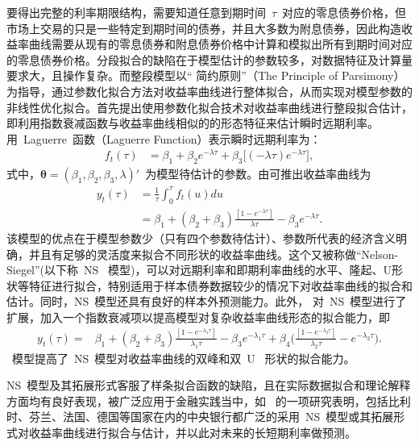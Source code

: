 要得出完整的利率期限结构，需要知道任意到期时间~$\tau$~对应的零息债券价格，但市场上交易的只是一些特定到期时间的债券，并且大多数为附息债券，因此构造收益率曲线需要从现有的零息债券和附息债券价格中计算和模拟出所有到期时间对应的零息债券价格。分段拟合的缺陷在于模型估计的参数较多，对数据特征及计算量要求大，且操作复杂。而整段模型以`` 简约原则''（The Principle of Parsimony）为指导，通过参数化拟合方法对收益率曲线进行整体拟合，从而实现对模型参数的非线性优化拟合。首先提出使用参数化拟合技术对收益率曲线进行整段拟合估计，即利用指数衰减函数与收益率曲线相似的的形态特征来估计瞬时远期利率。\citeauthor{nelson1987parsimonious}~ 用~Laguerre~函数（Laguerre Function）表示瞬时远期利率为：
\begin{align}
  f_t(\tau) &= \beta_1 + \beta_2 e^{-\lambda \tau} + \beta_3 \big[(-\lambda \tau) e^{-\lambda \tau}\big],
\end{align}
式中，$\bm{\theta}=(\beta_1,\beta_2,\beta_3,\lambda)'$~为模型待估计的参数。由可推出收益率曲线为
\begin{align}\label{ns}
 y_t{(\tau)} &= \frac{1}{\tau}\int_0^{\tau} \! f_t{(u)} du  \nonumber \\
             &= \beta_1 + (\beta_2+\beta_3) \frac{[1 - e^{-\lambda \tau}]}{\lambda \tau}
                - \beta_3 e^{-\lambda \tau}.
\end{align}
该模型的优点在于模型参数少（只有四个参数待估计）、参数所代表的经济含义明确，并且有足够的灵活度来拟合不同形状的收益率曲线。这个又被称做``Nelson-Siegel''\tsm (以下称~NS~ 模型)，可以对远期利率和即期利率曲线的水平、隆起、U形状等特征进行拟合，特别适用于样本债券数据较少的情况下对收益率曲线的拟合和估计。同时，NS~模型还具有良好的样本外预测能力。此外， 对~NS~模型进行了扩展，加入一个指数衰减项以提高模型对复杂收益率曲线形态的拟合能力，即
\begin{align}
  y_t{(\tau)} = & \beta_1 + (\beta_2+\beta_3) \frac{[1 - e^{-\lambda_1 \tau}]}{\lambda_1 \tau}
                - \beta_3 e^{-\lambda_1 \tau}
               + \beta_4\Big(
                            \frac{[1 - e^{-\lambda_2 \tau}]}{\lambda_2 \tau}
                               - e^{-\lambda_2 \tau}
                           \Big).
\end{align}
\citeauthor{svensson1994estimating}~模型提高了~NS~模型对收益率曲线的双峰和双~U~ 形状的拟合能力。

NS~模型及其拓展形式客服了样条拟合函数的缺陷，且在实际数据拟合和理论解释方面均有良好表现，被广泛应用于金融实践当中，如~ 的一项研究表明，包括比利时、芬兰、法国、德国等国家在内的中央银行都广泛的采用~NS~模型或其拓展形式对收益率曲线进行拟合与估计，并以此对未来的长短期利率做预测。


